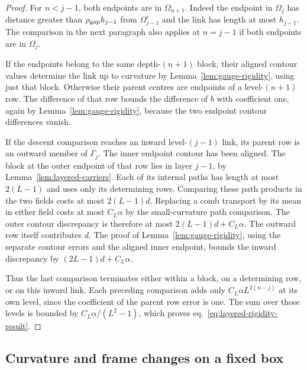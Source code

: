 \documentclass[11pt,letterpaper,reqno]{amsart}
\numberwithin{equation}{section}
\renewcommand{\eqref}[1]{\textup{eq.~\ref{#1}}}
\theoremstyle{definition}
\theoremstyle{remark}
\begin{document}
\begin{proof}
For $n<j-1$, both endpoints are in $\Omega_{n+1}$.
Indeed the endpoint in $\Omega_j$ has distance greater than
$\rho_{\rm gap} h_{j-1}$ from $\Omega_{j-1}^c$ and the link has length at most
$h_{j-1}$. The comparison in the next paragraph also applies at
$n=j-1$ if both endpoints are in $\Omega_j$.

If the endpoints belong to the same depth-$(n+1)$ block,
their aligned contour values determine the link up to curvature by
Lemma~\ref{lem:gauge-rigidity}, using just that block. Otherwise their
parent centres are endpoints of a level-$(n+1)$ row. The difference
of that row bounds the difference of $b$ with coefficient one,
again by Lemma~\ref{lem:gauge-rigidity}, because the two endpoint
contour differences vanish.


If the descent comparison reaches an inward level-$(j-1)$ link,
its parent row is an outward member of $\Gamma_j$. The inner
endpoint contour has been aligned. The block at the outer endpoint
of that row lies in layer $j-1$, by Lemma~\ref{lem:layered-carriers}.
Each of its internal paths has length at most $2(L-1)$ and uses
only its determining rows. Comparing these path products in the two
fields costs at most $2(L-1)d$. Replacing a comb transport by its
mean in either field costs at most $C_L\alpha$ by the small-curvature
path comparison. The outer contour discrepancy is therefore at
most $2(L-1)d+C_L\alpha$. The outward row itself contributes $d$.
The proof of Lemma~\ref{lem:gauge-rigidity}, using the separate
contour errors and the aligned inner endpoint, bounds the inward discrepancy by
$(2L-1)d+C_L\alpha$.

Thus the last comparison terminates either within a block, on a
determining row, or on this inward link. Each preceding comparison
adds only $C_L\alpha L^{2(n-j)}$ at its own level, since the coefficient
of the parent row error is one. The sum over those levels is bounded
by $C_L\alpha/(L^2-1)$, which proves
\eqref{eq:layered-rigidity-result}.
\end{proof}

\subsection{Curvature and frame changes on a fixed box}\label{sec:box-frames}
\end{document}
